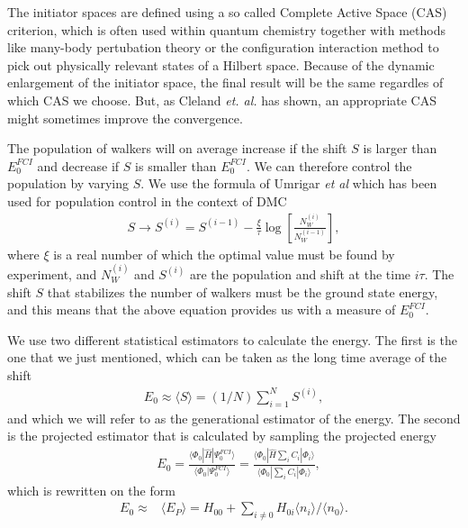 \documentclass[aps,twocolumn,showpacs,floatfix,nofootinbib,preprintnumbers,superscriptaddress,amsmath,amssymb]{revtex4-1}
\newcommand{\expec}[1]{\langle #1 \rangle}
\begin{document}
The initiator spaces are defined using a so called Complete Active
Space (CAS) criterion, which is often used within quantum chemistry
together with methods like many-body pertubation theory or the
configuration interaction method to pick out physically relevant
states of a Hilbert space.
%
Because of the dynamic enlargement of the initiator space, the final
result will be the same regardles of which CAS we choose. But, as
Cleland {\it et. al.} \cite{cleland2010} has shown, an appropriate CAS
might sometimes improve the convergence.


The population of walkers will on average increase if the shift $S$ is larger than $E^{FCI}_0$ and decrease if $S$ is smaller than $E_0^{FCI}$. 
%
We can therefore control the population by varying $S$. We use the formula of Umrigar {\em et al} 
\cite{Umrigar_1993} which has been used for population control in the context of DMC
\begin{align}
	S\to S^{(i)} = S^{(i-1)}- \frac{\xi}\tau \log\left[\frac{N_W^{(i)}}{N_W^{(i-1)}}\right],
	\label{eqvaryshift}
\end{align}
where $\xi$ is a real number of which the optimal value must be found by experiment, and $N_W^{(i)}$ and $S^{(i)}$ are the population and shift at the time $i\tau$. 
%
The shift $S$ that stabilizes the number of walkers must be the ground state energy, and this means 
%
that the above equation provides us with a measure of $E_0^{FCI}$.

We use two different statistical estimators to calculate the energy. The first is the one that we just mentioned, which can be taken as the long time average of the shift 
\begin{align}
	E_0\approx\expec S=(1/N) \sum_{i=1}^N S^{(i)},
	\label{eqvaryshift}
\end{align}
and which we will refer to as the generational estimator of the energy.
%
The second is the projected estimator that is calculated by sampling the projected energy
\begin{align}
	&E_0 = \frac{ \expec{ \Phi_0|\hat H|\Psi_0^{FCI} } }{\expec{ \Phi_0|\Psi_0^{FCI} }} 
	= \frac{ \expec{ \Phi_0|\hat H\sum_iC_i|\Phi_i} }{\expec{ \Phi_0|\sum_iC_i|\Phi_i }} \label{eqProje1},
\end{align}
which is rewritten on the form
\begin{align}
	E_0 \approx &\expec{E_P} = H_{00} + \sum_{i\neq0}H_{0i} \expec{n_i}/\expec{n_0}.
	\label{}
\end{align}
\end{document}
